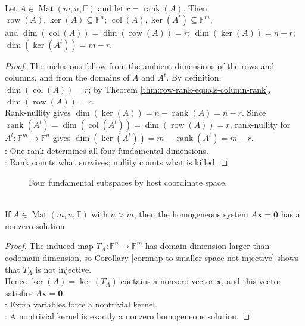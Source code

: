 \begin{theorem} \label{thm:matrix-four-fundamental-subspaces-dimensions} \\
Let $A\in\operatorname{Mat}(m,n,\mathbb{F})$ and let $r=\operatorname{rank}(A)$. Then $\operatorname{row}(A),\ker(A) \subseteq \mathbb{F}^n$; $\operatorname{col}(A),\ker(A^t) \subseteq \mathbb{F}^m$,\\
and $\dim(\operatorname{col}(A))=\dim(\operatorname{row}(A))=r$; $\dim(\ker(A))=n-r$; $\dim(\ker(A^t))=m-r$.
\begin{proof}
The inclusions follow from the ambient dimensions of the rows and columns, and from the domains of $A$ and $A^t$. By definition, $\dim(\operatorname{col}(A))=r$; by Theorem \ref{thm:row-rank-equals-column-rank}, $\dim(\operatorname{row}(A))=r$.\\
Rank-nullity gives $\dim(\ker(A))=n-\operatorname{rank}(A)=n-r$. Since $\operatorname{rank}(A^t)=\dim(\operatorname{col}(A^t))=\dim(\operatorname{row}(A))=r$, rank-nullity for $A^t:\mathbb{F}^m\to\mathbb{F}^n$ gives $\dim(\ker(A^t))=m-\operatorname{rank}(A^t)=m-r$.\\
: One rank determines all four fundamental dimensions.\\
: Rank counts what survives; nullity counts what is killed.
\end{proof}
\end{theorem}

\begin{figure}[H]
  \centering
  \scalebox{0.9}{}
  \caption{Four fundamental subspaces by host coordinate space.}
  \label{fig:four-fundamental-subspaces-hosts}
\end{figure}

\begin{corollary} \label{cor:homogeneous-system-more-variables-than-equations} \\
If $A\in\operatorname{Mat}(m,n,\mathbb{F})$ with $n>m$, then the homogeneous system $A\mathbf{x}=\mathbf{0}$ has a nonzero solution.
\begin{proof}
The induced map $T_A:\mathbb{F}^n\to\mathbb{F}^m$ has domain dimension larger than codomain dimension, so Corollary \ref{cor:map-to-smaller-space-not-injective} shows that $T_A$ is not injective.\\
Hence $\ker(A)=\ker(T_A)$ contains a nonzero vector $\mathbf{x}$, and this vector satisfies $A\mathbf{x}=\mathbf{0}$.\\
: Extra variables force a nontrivial kernel.\\
: A nontrivial kernel is exactly a nonzero homogeneous solution.
\end{proof}
\end{corollary}

